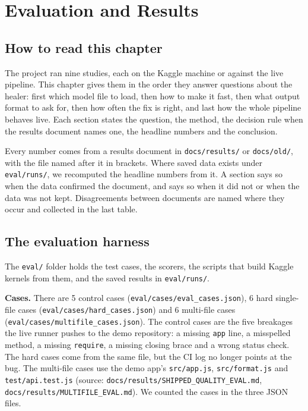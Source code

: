 
\chapter{Evaluation and Results}

\section{How to read this chapter}

The project ran nine studies, each on the Kaggle machine or against the live pipeline. This chapter gives them in the order they answer questions about the healer: first which model file to load, then how to make it fast, then what output format to ask for, then how often the fix is right, and last how the whole pipeline behaves live. Each section states the question, the method, the decision rule when the results document names one, the headline numbers and the conclusion.

Every number comes from a results document in \texttt{docs/\allowbreak{}results/\allowbreak{}} or \texttt{docs/\allowbreak{}old/\allowbreak{}}, with the file named after it in brackets. Where saved data exists under \texttt{eval/\allowbreak{}runs/\allowbreak{}}, we recomputed the headline numbers from it. A section says so when the data confirmed the document, and says so when it did not or when the data was not kept. Disagreements between documents are named where they occur and collected in the last table.

\section{The evaluation harness}

The \texttt{eval/\allowbreak{}} folder holds the test cases, the scorers, the scripts that build Kaggle kernels from them, and the saved results in \texttt{eval/\allowbreak{}runs/\allowbreak{}}.

\textbf{Cases.} There are 5 control cases (\texttt{eval/\allowbreak{}cases/\allowbreak{}eval\_\allowbreak{}cases.\allowbreak{}json}), 6 hard single-file cases (\texttt{eval/\allowbreak{}cases/\allowbreak{}hard\_\allowbreak{}cases.\allowbreak{}json}) and 6 multi-file cases (\texttt{eval/\allowbreak{}cases/\allowbreak{}multifile\_\allowbreak{}cases.\allowbreak{}json}). The control cases are the five breakages the live runner pushes to the demo repository: a missing \texttt{app} line, a misspelled method, a missing \texttt{require}, a missing closing brace and a wrong status check. The hard cases come from the same file, but the CI log no longer points at the bug. The multi-file cases use the demo app's \texttt{src/\allowbreak{}app.\allowbreak{}js}, \texttt{src/\allowbreak{}format.\allowbreak{}js} and \texttt{test/\allowbreak{}api.\allowbreak{}test.\allowbreak{}js} (source: \texttt{docs/\allowbreak{}results/\allowbreak{}SHIPPED\_\allowbreak{}QUALITY\_\allowbreak{}EVAL.\allowbreak{}md}, \texttt{docs/\allowbreak{}results/\allowbreak{}MULTIFILE\_\allowbreak{}EVAL.\allowbreak{}md}). We counted the cases in the three JSON files.

